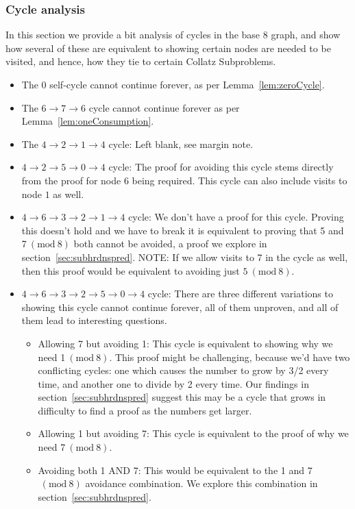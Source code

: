 \documentclass[12pt]{article}
\newcommand{\Mod}[1]{\ (\mathrm{mod}\ #1)}
\theoremstyle{definition}
\begin{document}
\subsubsection{Cycle analysis} \label{subsubsec:cycleanalysis}
In this section we provide a bit analysis of cycles in the base 8 graph, and show how several of these are equivalent to showing certain nodes are needed to be visited, and hence, how they tie to certain Collatz Subproblems.
\begin{itemize}
    \item The 0 self-cycle cannot continue forever, as per Lemma~\ref{lem:zeroCycle}.
    \item The $6 \rightarrow 7 \rightarrow 6$ cycle cannot continue forever as per Lemma~\ref{lem:oneConsumption}.
    \item The $4 \rightarrow 2 \rightarrow 1 \rightarrow 4$ cycle: Left blank, see margin note. 
    \item $4 \rightarrow 2 \rightarrow 5 \rightarrow 0 \rightarrow 4$ cycle: The proof for avoiding this cycle stems directly from the proof for node $6$ being required. This cycle can also include visits to node $1$ as well.
    \item $4 \rightarrow 6 \rightarrow 3 \rightarrow 2 \rightarrow 1 \rightarrow 4$ cycle: We don't have a proof for this cycle. Proving this doesn't hold and we have to break it is equivalent to proving that 5 and 7$\Mod{8}$ both cannot be avoided, a proof we explore in section~\ref{sec:subhrdnspred}. NOTE: If we allow visits to 7 in the cycle as well, then this proof would be equivalent to avoiding just $5 \Mod{8}$.
    \item $4 \rightarrow 6 \rightarrow 3 \rightarrow 2 \rightarrow 5 \rightarrow 0 \rightarrow 4$ cycle: There are three different variations to showing this cycle cannot continue forever, all of them unproven, and all of them lead to interesting questions.
    \begin{itemize}
        \item Allowing 7 but avoiding 1: This cycle is equivalent to showing why we need 1$\Mod{8}$. This proof might be challenging, because we'd have two conflicting cycles: one which causes the number to grow by 3/2 every time, and another one to divide by 2 every time. Our findings in section~\ref{sec:subhrdnspred} suggest this may be a cycle that grows in difficulty to find a proof as the numbers get larger.
        \item Allowing 1 but avoiding 7: This cycle is equivalent to the proof of why we need 7$\Mod{8}$. 
        \item Avoiding both 1 AND 7: This would be equivalent to the 1 and 7$\Mod{8}$ avoidance combination. We explore this combination in section~\ref{sec:subhrdnspred}.
    \end{itemize}
\end{itemize}
\end{document}
